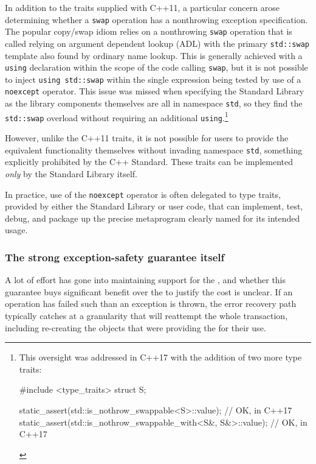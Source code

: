 In addition to the traits supplied with C++11, a particular concern
arose determining whether a \lstinline!swap! operation has a nonthrowing
exception specification. The popular copy/swap idiom relies on a
nonthrowing \lstinline!swap! operation that is called relying on argument
dependent lookup (ADL) with the primary \lstinline!std::swap! template also
found by ordinary name lookup. This is generally achieved with a
\lstinline!using! declaration within the scope of the code calling
\lstinline!swap!, but it is not possible to inject
\lstinline!using!~\lstinline!std::swap! within the single expression being
tested by use of a \lstinline!noexcept! operator. This issue was missed
when specifying the Standard Library as the library components
themselves are all in namespace \lstinline!std!, so they find the
\lstinline!std::swap! overload without requiring an additional
\lstinline!using!.{\cprotect\footnote{This oversight was addressed in C++17
with the addition of two more type traits:

\begin{emcppshiddenlisting}[emcppsbatch=e29]
#include <type_traits>
struct S{};
\end{emcppshiddenlisting}
\begin{emcppslisting}[style=footcode,emcppsbatch=e29,emcppsstandards={c++17}]
static_assert(std::is_nothrow_swappable<S>::value);            // OK, in C++17
static_assert(std::is_nothrow_swappable_with<S&, S&>::value);  // OK, in C++17
\end{emcppslisting}
      }}

However, unlike the C++11 traits, it is not possible for users to
provide the equivalent functionality themselves without invading
namespace \lstinline!std!, something explicitly prohibited by the C++
Standard. These traits can be implemented \emph{only} by the Standard
Library itself.

In practice, use of the \lstinline!noexcept! operator is often delegated to
type traits, provided by either the Standard Library or user code, that
can implement, test, debug, and package up the precise metaprogram
clearly named for its intended usage.

\subsubsection[The strong exception-safety guarantee itself]{The strong exception-safety guarantee itself}\label{the-strong-exception-safety-guarantee-itself}

A lot of effort has gone into maintaining support for the , and whether this guarantee buys significant
benefit over the  to justify
the cost is unclear. If an operation has failed such than an exception
is thrown, the error recovery path typically catches at a granularity
that will reattempt the whole transaction, including re-creating the
objects that were providing the  for their use.

